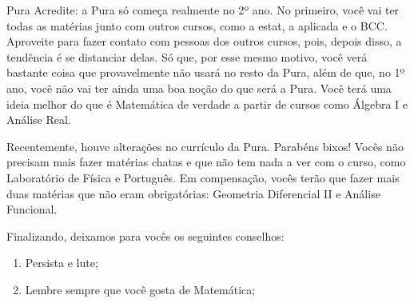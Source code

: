 \begin{subsecao}{Pura}
Acredite: a Pura só começa realmente no 2º ano. No primeiro, você vai ter
todas as matérias junto com outros cursos, como a estat, a aplicada e o BCC.
Aproveite para fazer contato com pessoas dos outros cursos, pois, depois
disso, a tendência é se distanciar delas. Só que, por esse mesmo motivo, você
verá bastante coisa que provavelmente não usará no resto da Pura, além de que,
no 1º ano, você não vai ter ainda uma boa noção do que será a Pura. Você
terá uma ideia melhor do que é Matemática de verdade a partir de cursos
como Álgebra I e Análise Real.


Recentemente, houve alterações no currículo da Pura. Parabéns bixos! Vocês não
precisam mais fazer matérias chatas e que não tem nada a ver com o curso, como
Laboratório de Física e Português. Em compensação, vocês terão que fazer mais
duas matérias que não eram obrigatórias: Geometria Diferencial II e Análise Funcional.

Finalizando, deixamos para vocês os seguintes conselhos:
\begin{enumerate}


\item	Persista e lute;
\item	Lembre sempre que você gosta de Matemática;


\end{enumerate}
\end{subsecao}
